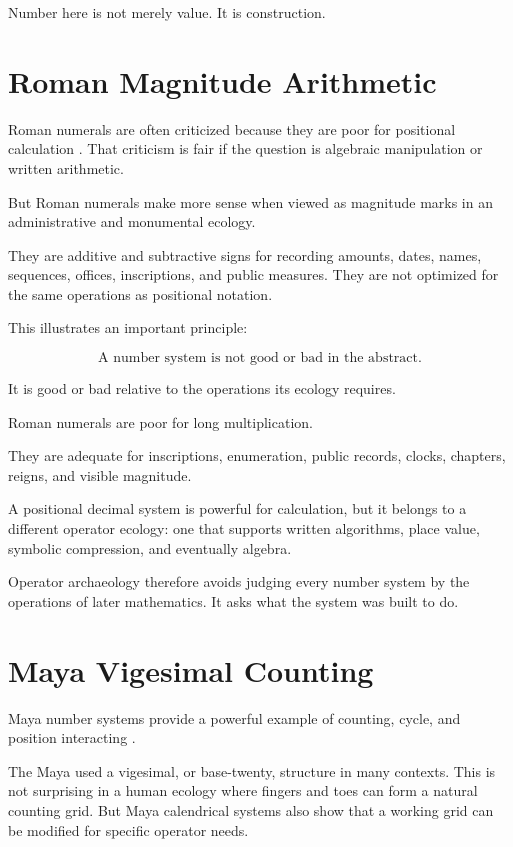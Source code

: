 \documentclass[11pt]{book}
\begin{document}
Number here is not merely value. It is construction.

\section{Roman Magnitude Arithmetic}

Roman numerals are often criticized because they are poor for positional calculation \cite{Ifrah2000UniversalHistoryNumbers,Menninger1969NumberWordsSymbols}. That criticism is fair if the question is algebraic manipulation or written arithmetic.

But Roman numerals make more sense when viewed as magnitude marks in an administrative and monumental ecology.

They are additive and subtractive signs for recording amounts, dates, names, sequences, offices, inscriptions, and public measures. They are not optimized for the same operations as positional notation.

This illustrates an important principle:

\[
\text{A number system is not good or bad in the abstract.}
\]

It is good or bad relative to the operations its ecology requires.

Roman numerals are poor for long multiplication.

They are adequate for inscriptions, enumeration, public records, clocks, chapters, reigns, and visible magnitude.

A positional decimal system is powerful for calculation, but it belongs to a different operator ecology: one that supports written algorithms, place value, symbolic compression, and eventually algebra.

Operator archaeology therefore avoids judging every number system by the operations of later mathematics. It asks what the system was built to do.

\section{Maya Vigesimal Counting}

Maya number systems provide a powerful example of counting, cycle, and position interacting \cite{BrickerBricker2011AstronomyMayaCodices,Thompson1950MayaHieroglyphicWriting,Coe2011Maya}.

The Maya used a vigesimal, or base-twenty, structure in many contexts. This is not surprising in a human ecology where fingers and toes can form a natural counting grid. But Maya calendrical systems also show that a working grid can be modified for specific operator needs.
\end{document}
